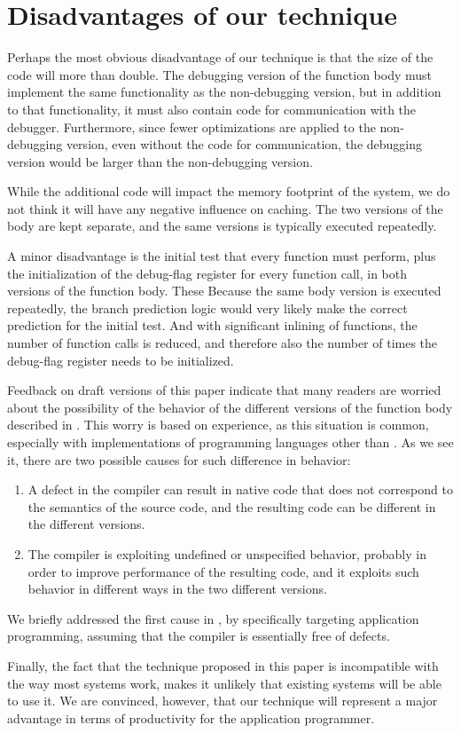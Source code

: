 \section{Disadvantages of our technique}

Perhaps the most obvious disadvantage of our technique is that the
size of the code will more than double.  The debugging version of the
function body must implement the same functionality as the
non-debugging version, but in addition to that functionality, it must
also contain code for communication with the debugger.  Furthermore,
since fewer optimizations are applied to the non-debugging version,
even without the code for communication, the debugging version would
be larger than the non-debugging version.

While the additional code will impact the memory footprint of the
system, we do not think it will have any negative influence on
caching.  The two versions of the body are kept separate, and the same
versions is typically executed repeatedly.

A minor disadvantage is the initial test that every function must
perform, plus the initialization of the debug-flag register for every
function call, in both versions of the function body.  These
Because the same body version is executed repeatedly, the branch
prediction logic would very likely make the correct prediction for the
initial test.  And with significant inlining of functions, the number
of function calls is reduced, and therefore also the number of times
the debug-flag register needs to be initialized.

Feedback on draft versions of this paper indicate that many readers
are worried about the possibility of the behavior of the different
versions of the function body described in
.  This worry is based on experience,
as this situation is common, especially with implementations of
programming languages other than \commonlisp{}.  As we see it, there
are two possible causes for such difference in behavior:

\begin{enumerate}
\item A defect in the compiler can result in native code that does not
  correspond to the semantics of the source code, and the resulting
  code can be different in the different versions.
\item The compiler is exploiting undefined or unspecified behavior,
  probably in order to improve performance of the resulting code, and
  it exploits such behavior in different ways in the two different
  versions.
\end{enumerate}

We briefly addressed the first cause in , by
specifically targeting application programming, assuming that the
compiler is essentially free of defects.

Finally, the fact that the technique proposed in this paper is
incompatible with the way most \commonlisp{} systems work, makes it
unlikely that existing systems will be able to use it.  We are
convinced, however, that our technique will represent a major
advantage in terms of productivity for the application programmer.
